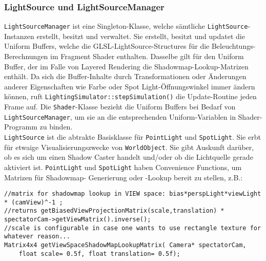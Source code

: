 
\label{sec:visualDomain}
	

\subsubsection{LightSource und LightSourceManager}
	
	\lstinline|LightSourceManager| ist eine Singleton-Klasse, welche sämtliche 
	\lstinline|LightSource|-Instanzen erstellt, besitzt und verwaltet. Sie erstellt, besitzt
	und updatet die Uniform Buffers, welche die GLSL-LightSource-Structures für die Beleuchtungs-Berechnungen
	im Fragment Shader enthalten. Dasselbe gilt für den Uniform Buffer, der im Falle von Layered Rendering
	die Shadowmap-Lookup-Matrizen enthält. Da sich die Buffer-Inhalte durch Transformationen oder Änderungen
	anderer Eigenschaften wie Farbe oder Spot Light-Öffnungswinkel immer ändern können, ruft 
	\lstinline|LightingSimulator::stepSimulation()| die Update-Routine jeden Frame auf.
	Die \lstinline|Shader|-Klasse bezieht die Uniform Buffers bei Bedarf von \lstinline|LightSourceManager|,
	um sie an die entsprechenden Uniform-Variablen in Shader-Programm zu binden.\\
	
	\lstinline|LightSource| ist die abtrakte Basisklasse für \lstinline|PointLight| und \lstinline|SpotLight|.
	Sie erbt für etwaige Visualisierungszwecke von \lstinline|WorldObject|. Sie gibt Auskunft darüber, ob es sich
	um einen Shadow Caster handelt und/oder ob die Lichtquelle gerade aktiviert ist.
	\lstinline|PointLight| und \lstinline|SpotLight| haben Convenience Functions, um Matrizen für Shadowmap-
	Generierung oder -Lookup bereit zu stellen, z.B.:
	 
	\begin{lstlisting}
//matrix for shadowmap lookup in VIEW space: bias*perspLight*viewLight * (camView)^-1 ;
//returns getBiasedViewProjectionMatrix(scale,translation) * spectatorCam->getViewMatrix().inverse();
//scale is configurable in case one wants to use rectangle texture for whatever reason...
Matrix4x4 getViewSpaceShadowMapLookupMatrix( Camera* spectatorCam,
	float scale= 0.5f, float translation= 0.5f);
	\end{lstlisting}
	 
